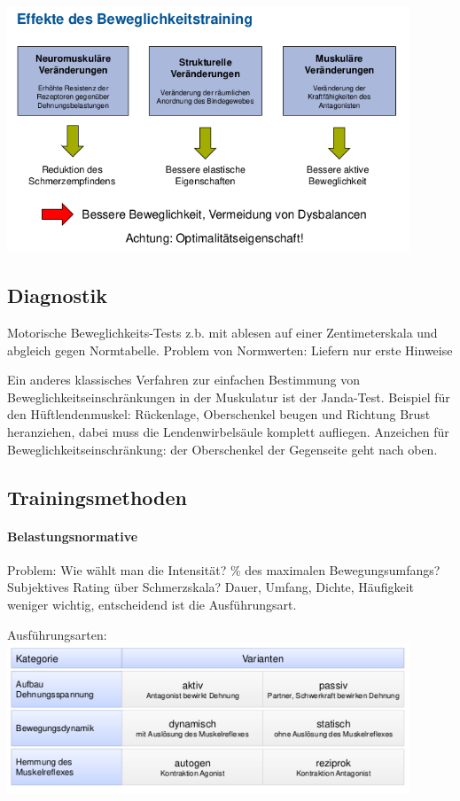 \includegraphics[width=0.9\textwidth]{pictures/beweg_effekte}

\subsection{Diagnostik}

Motorische Beweglichkeits-Tests z.b. mit ablesen auf einer Zentimeterskala und abgleich gegen Normtabelle. Problem von Normwerten: Liefern nur erste Hinweise

Ein anderes klassisches Verfahren zur einfachen Bestimmung von Beweglichkeitseinschränkungen in der Muskulatur  ist der Janda-Test.
Beispiel für den Hüftlendenmuskel: Rückenlage, Oberschenkel beugen und Richtung Brust heranziehen, dabei muss die Lendenwirbelsäule komplett aufliegen.
Anzeichen für Beweglichkeitseinschränkung: der Oberschenkel der Gegenseite geht nach oben.

\subsection{Trainingsmethoden}

\paragraph*{Belastungsnormative}
Problem: Wie wählt man die Intensität? \% des maximalen Bewegungsumfangs? Subjektives Rating über Schmerzskala?
Dauer, Umfang, Dichte, Häufigkeit weniger wichtig, entscheidend ist die Ausführungsart.

Ausführungsarten:
\includegraphics[width=0.9\textwidth]{pictures/beweg_ausfuehrungsarten}

